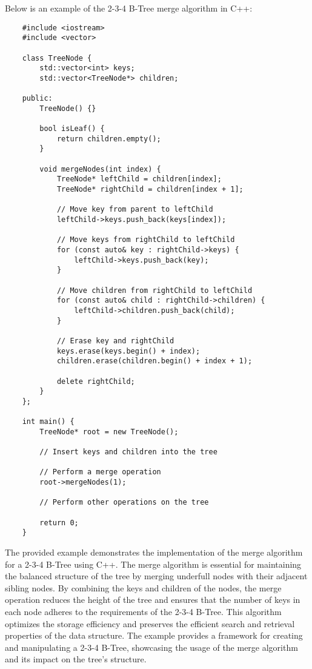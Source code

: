 \begin{solution}
    Below is an example of the 2-3-4 B-Tree merge algorithm in C++:

    \horizontalline

    \begin{verbatim}
    #include <iostream>
    #include <vector>
    
    class TreeNode {
        std::vector<int> keys;
        std::vector<TreeNode*> children;
    
    public:
        TreeNode() {}
    
        bool isLeaf() {
            return children.empty();
        }
    
        void mergeNodes(int index) {
            TreeNode* leftChild = children[index];
            TreeNode* rightChild = children[index + 1];
    
            // Move key from parent to leftChild
            leftChild->keys.push_back(keys[index]);
    
            // Move keys from rightChild to leftChild
            for (const auto& key : rightChild->keys) {
                leftChild->keys.push_back(key);
            }
    
            // Move children from rightChild to leftChild
            for (const auto& child : rightChild->children) {
                leftChild->children.push_back(child);
            }
    
            // Erase key and rightChild
            keys.erase(keys.begin() + index);
            children.erase(children.begin() + index + 1);
    
            delete rightChild;
        }
    };
    
    int main() {
        TreeNode* root = new TreeNode();
    
        // Insert keys and children into the tree
    
        // Perform a merge operation
        root->mergeNodes(1);
    
        // Perform other operations on the tree
    
        return 0;
    }        
    \end{verbatim}

    \horizontalline

    The provided example demonstrates the implementation of the merge algorithm for a 2-3-4 B-Tree using C++. The merge algorithm is essential for maintaining the balanced structure of the tree by merging underfull nodes with their adjacent sibling nodes. By combining the keys and children of the nodes, the merge operation reduces 
    the height of the tree and ensures that the number of keys in each node adheres to the requirements of the 2-3-4 B-Tree. This algorithm optimizes the storage efficiency and preserves the efficient search and retrieval properties of the data structure. The example provides a framework for creating and manipulating a 2-3-4 B-Tree, 
    showcasing the usage of the merge algorithm and its impact on the tree's structure.
\end{solution}

